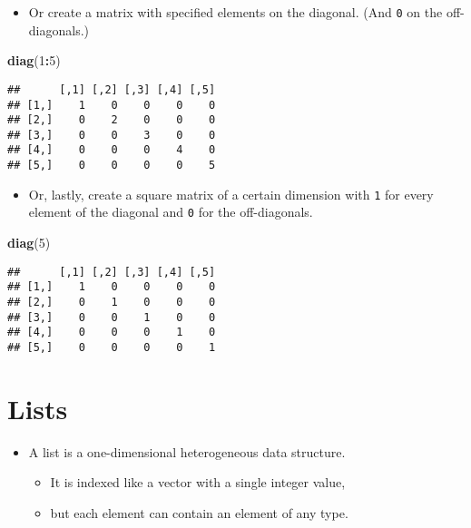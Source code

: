 \documentclass[]{book}
\newenvironment{Shaded}{\begin{snugshade}}{\end{snugshade}}
\newcommand{\DecValTok}[1]{\textcolor[rgb]{0.00,0.00,0.81}{#1}}
\newcommand{\KeywordTok}[1]{\textcolor[rgb]{0.13,0.29,0.53}{\textbf{#1}}}
\newcommand{\NormalTok}[1]{#1}
\newcommand{\OperatorTok}[1]{\textcolor[rgb]{0.81,0.36,0.00}{\textbf{#1}}}
\providecommand{\tightlist}{%
  \setlength{\itemsep}{0pt}\setlength{\parskip}{0pt}}
\begin{document}
\begin{itemize}
\tightlist
\item
  Or create a matrix with specified elements on the diagonal. (And \texttt{0} on the off-diagonals.)
\end{itemize}

\begin{Shaded}
\begin{Highlighting}[]
\KeywordTok{diag}\NormalTok{(}\DecValTok{1}\OperatorTok{:}\DecValTok{5}\NormalTok{)}
\end{Highlighting}
\end{Shaded}

\begin{verbatim}
##      [,1] [,2] [,3] [,4] [,5]
## [1,]    1    0    0    0    0
## [2,]    0    2    0    0    0
## [3,]    0    0    3    0    0
## [4,]    0    0    0    4    0
## [5,]    0    0    0    0    5
\end{verbatim}

\begin{itemize}
\tightlist
\item
  Or, lastly, create a square matrix of a certain dimension with \texttt{1} for every element of the diagonal and \texttt{0} for the off-diagonals.
\end{itemize}

\begin{Shaded}
\begin{Highlighting}[]
\KeywordTok{diag}\NormalTok{(}\DecValTok{5}\NormalTok{)}
\end{Highlighting}
\end{Shaded}

\begin{verbatim}
##      [,1] [,2] [,3] [,4] [,5]
## [1,]    1    0    0    0    0
## [2,]    0    1    0    0    0
## [3,]    0    0    1    0    0
## [4,]    0    0    0    1    0
## [5,]    0    0    0    0    1
\end{verbatim}

\hypertarget{lists}{%
\section{Lists}\label{lists}}

\begin{itemize}
\tightlist
\item
  A list is a one-dimensional heterogeneous data structure.

  \begin{itemize}
  \tightlist
  \item
    It is indexed like a vector with a single integer value,
  \item
    but each element can contain an element of any type.
  \end{itemize}
\end{itemize}
\end{document}
